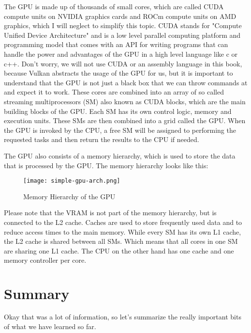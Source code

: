 \documentclass[12pt]{report} \usepackage{preamble}
\begin{document}
The GPU is made up of thousands of small cores, which are called CUDA
compute units on NVIDIA graphics cards \cite{CUDA_Programming_Guide}
and ROCm compute units on AMD graphics, which I will neglect to
simplify this topic. \cite{rocm} CUDA stands for "Compute Unified
Device Architecture" and is a low level parallel computing platform
and programming model that comes with an API for writing programs
that can handle the power and advantages of the GPU in a high level
language like c or c++. \cite{CUDA_Programming_Guide} Don't worry, we
will not use CUDA or an assembly language in this book, because Vulkan
abstracts the usage of the GPU for us, but it is important to understand
that the GPU is not just a black box that we can throw commands at and
expect it to work. These cores are combined into an array of so called
streaming multiprocessors (SM) also known as CUDA blocks, which are the
main building blocks of the GPU.  Each SM has its own control logic,
memory and execution units. \cite{CUDA_Programming_Guide} These SMs are
then combined into a grid called the GPU.  When the GPU is invoked by
the CPU, a free SM will be assigned to performing the requested tasks
and then return the results to the CPU if needed. \cite{CUDA_Programming_Guide}

The GPU also consists of a memory hierarchy, which is used to store the
data that is processed by the GPU. The memory hierarchy looks like this:

\begin{figure}[hbtp]
	\centering
	\texttt{[image: simple-gpu-arch.png]}
	\caption{Memory Hierarchy of the GPU \cite{fig:gpu-arch}}
\end{figure}

Please note that the VRAM is not part of the memory hierarchy, but is
connected to the L2 cache. Caches are used to store frequently used
data and to reduce access times to the main memory. While every SM
has its own L1 cache, the L2 cache is shared between all SMs. Which
means that all cores in one SM are sharing one L1 cache. The CPU
on the other hand has one cache and one memory controller per
core. \cite{CUDA_Programming_Guide}

\section {Summary}

Okay that was a lot of information, so let's summarize the really
important bits of what we have learned so far.
\end{document}

